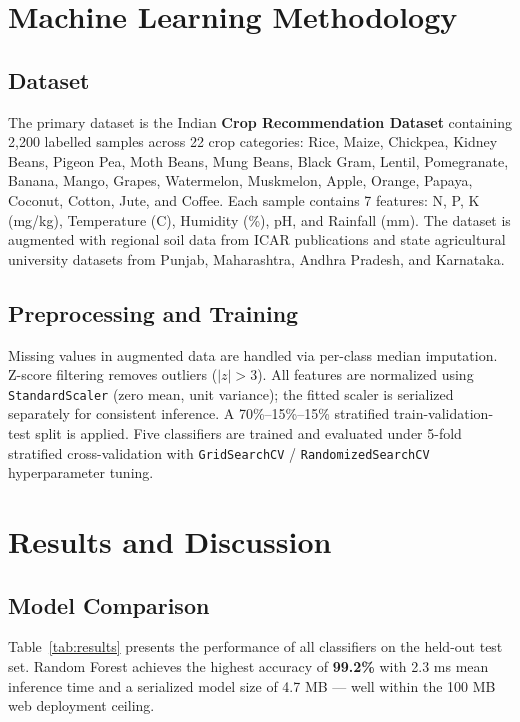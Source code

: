 \documentclass[10pt,twocolumn]{article}
\begin{document}
\section{Machine Learning Methodology}

\subsection{Dataset}

The primary dataset is the Indian \textbf{Crop Recommendation Dataset} \cite{atharvaingle2020} containing 2,200 labelled samples across 22 crop categories: Rice, Maize, Chickpea, Kidney Beans, Pigeon Pea, Moth Beans, Mung Beans, Black Gram, Lentil, Pomegranate, Banana, Mango, Grapes, Watermelon, Muskmelon, Apple, Orange, Papaya, Coconut, Cotton, Jute, and Coffee. Each sample contains 7 features: N, P, K (mg/kg), Temperature (\textdegree C), Humidity (\%), pH, and Rainfall (mm). The dataset is augmented with regional soil data from ICAR publications and state agricultural university datasets from Punjab, Maharashtra, Andhra Pradesh, and Karnataka.

\subsection{Preprocessing and Training}

Missing values in augmented data are handled via per-class median imputation. Z-score filtering removes outliers ($|z|>3$). All features are normalized using \texttt{StandardScaler} (zero mean, unit variance); the fitted scaler is serialized separately for consistent inference. A 70\%--15\%--15\% stratified train-validation-test split is applied. Five classifiers are trained and evaluated under 5-fold stratified cross-validation with \texttt{GridSearchCV} / \texttt{RandomizedSearchCV} hyperparameter tuning.

\section{Results and Discussion}

\subsection{Model Comparison}

Table~\ref{tab:results} presents the performance of all classifiers on the held-out test set. Random Forest achieves the highest accuracy of \textbf{99.2\%} with 2.3 ms mean inference time and a serialized model size of 4.7 MB --- well within the 100 MB web deployment ceiling.
\end{document}
